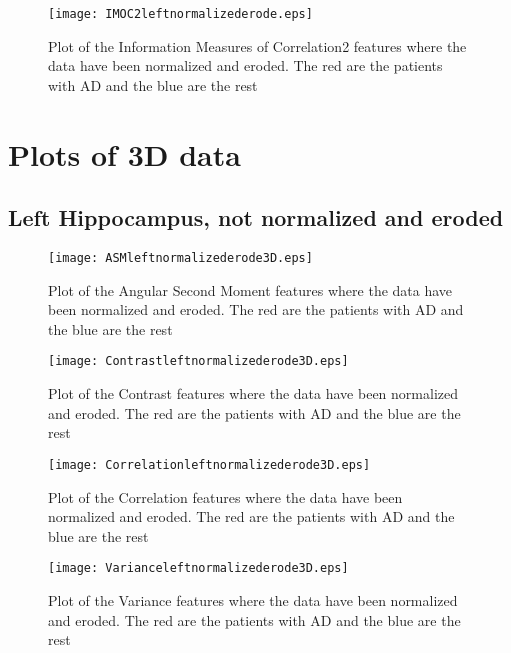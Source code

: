 \begin{figure}[H]
  \centering
  \texttt{[image: IMOC2leftnormalizederode.eps]}
  \caption{Plot of the Information Measures of Correlation2 features where the data have been normalized and eroded. The red are the patients with AD and the blue are the rest}\label{fig:IMOC2leftnormalizederode}
\end{figure}

\section{Plots of 3D data}

\subsection{Left Hippocampus, not normalized and eroded}

\begin{figure}[H]
  \centering
  \texttt{[image: ASMleftnormalizederode3D.eps]}
  \caption{Plot of the Angular Second Moment features where the data have been normalized and eroded. The red are the patients with AD and the blue are the rest}\label{fig:ASMLeftNormalizedEroded3D}
\end{figure}

\begin{figure}[H]
  \centering
  \texttt{[image: Contrastleftnormalizederode3D.eps]}
  \caption{Plot of the Contrast features where the data have been normalized and eroded. The red are the patients with AD and the blue are the rest}\label{fig:ContrastLeftNormalizedEroded3D}
\end{figure}

\begin{figure}[H]
  \centering
  \texttt{[image: Correlationleftnormalizederode3D.eps]}
  \caption{Plot of the Correlation features where the data have been normalized and eroded. The red are the patients with AD and the blue are the rest}\label{fig:Correlationleftnormalizederode3D}
\end{figure}

\begin{figure}[H]
  \centering
  \texttt{[image: Varianceleftnormalizederode3D.eps]}
  \caption{Plot of the Variance features where the data have been normalized and eroded. The red are the patients with AD and the blue are the rest}\label{fig:Varianceleftnormalizederode3D}
\end{figure}

